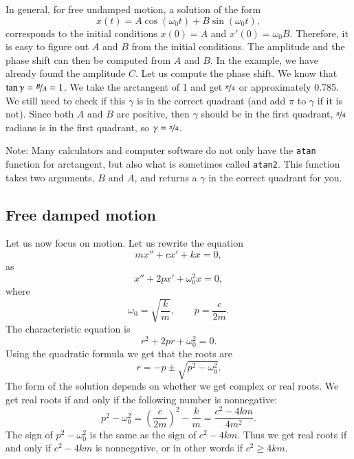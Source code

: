 In general, for free undamped motion, a solution of the
form
\begin{equation*}
x(t) = A \cos (\omega_0 t) + B \sin (\omega_0 t) ,
\end{equation*}
corresponds to the initial conditions $x(0) = A$ and $x'(0) = \omega_0 B$.
Therefore, it is easy to figure out $A$ and $B$ from the initial
conditions. 
The amplitude and the phase shift can then be computed from $A$ and $B$.
In the example, we have already found the amplitude $C$.  Let us
compute the phase shift.  We know that $\tan \gamma = \nicefrac{B}{A} = 1$.  We take the
arctangent of 1 and get $\nicefrac{\pi}{4}$ or approximately 0.785.
We still need to check if this $\gamma$ is in the correct quadrant
(and add $\pi$ to $\gamma$ if it is not).
Since both $A$ and $B$ are positive, then $\gamma$ should be in the first
quadrant, $\nicefrac{\pi}{4}$ radians is in the first quadrant, so $\gamma =
\nicefrac{\pi}{4}$.

Note: Many
calculators and computer software do not only have the
\texttt{atan} function
for arctangent, but also what is sometimes called \texttt{atan2}.
This function
takes two arguments, $B$ and $A$, and returns a $\gamma$ in the
correct quadrant for you.

\subsection{Free damped motion}


Let us now focus on  motion.  Let us rewrite the equation
\begin{equation*}
m x'' + c x' + kx = 0,
\end{equation*}
as
\begin{equation*}
x'' + 2p x' + \omega_0^2 x = 0,
\end{equation*}
where
\begin{equation*}
\omega_0 = \sqrt{\frac{k}{m}}, \qquad p = \frac{c}{2m} .
\end{equation*}
The characteristic equation is
\begin{equation*}
r^2 + 2 pr + \omega_0^2 = 0 .
\end{equation*}
Using the quadratic formula we get that the roots are
\begin{equation*}
r = -p \pm \sqrt{p^2 - \omega_0^2} .
\end{equation*}
The form of the solution depends on whether we get complex or real roots.
We get real roots if and only if the following number is nonnegative:
\begin{equation*}
p^2 - \omega_0^2 = {\left( \frac{c}{2m} \right)}^2 - \frac{k}{m}
= \frac{c^2 - 4km}{4m^2} .
\end{equation*}
The sign of $p^2-\omega_0^2$ is the same as the sign of
$c^2 - 4km$.  Thus we get real roots if and only if $c^2-4km$ is
nonnegative, or in other words if $c^2 \geq 4km$.

